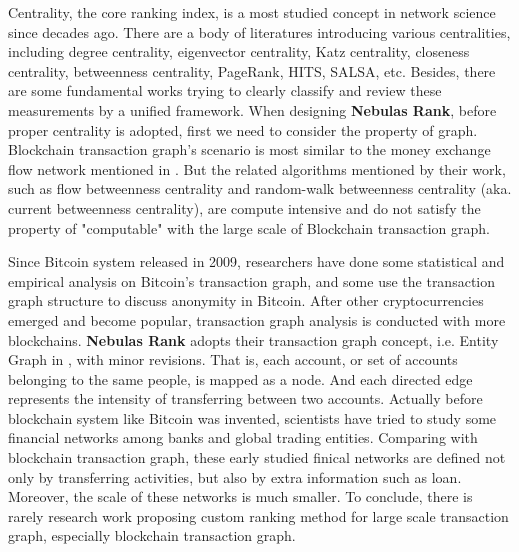 Centrality, the core ranking index, is a most studied concept in network science since decades ago\cite{newman2010networks}. There are a body of literatures introducing various centralities, including degree centrality\cite{freeman1979set}, eigenvector centrality\cite{bonacich1972factoring}, Katz centrality\cite{katz1953new}, closeness centrality\cite{sabidussi1966centrality}, betweenness centrality\cite{freeman1977set}\cite{freeman1978centrality}\cite{freeman1991centrality}\cite{noh2004random}\cite{newman2005measure}, PageRank\cite{Brin2010}, HITS\cite{kleinberg1999authoritative}, SALSA\cite{Science2001}, etc. Besides, there are some fundamental works trying to clearly classify and review these measurements by a unified framework\cite{Borgatti2005}\cite{Borgatti2006}\cite{Lu2016}. When designing \textbf{Nebulas Rank}, before proper centrality is adopted, first we need to consider the property of graph. Blockchain transaction graph's scenario is most similar to the money exchange flow network mentioned in \cite{Borgatti2005}. But the related algorithms mentioned by their work, such as flow betweenness centrality\cite{freeman1991centrality} and random-walk betweenness centrality (aka. current betweenness centrality)\cite{newman2005measure}, are compute intensive and do not satisfy the property of "computable" with the large scale of Blockchain transaction graph.

Since Bitcoin\cite{Nakamoto2008} system released in 2009, researchers have done some statistical and empirical analysis on Bitcoin's transaction graph\cite{Ron}\cite{Haslhofer}\cite{NielKondor2014}\cite{Baumann2014}, and some use the transaction graph structure to discuss anonymity in Bitcoin\cite{Meiklejohn2013}\cite{Ober2013}\cite{pham2016anomaly}\cite{Fleder2015}\cite{Ferrin2015}. After other cryptocurrencies emerged and become popular, transaction graph analysis is conducted with more blockchains\cite{Chang2017}\cite{Anderson2016}. \textbf{Nebulas Rank} adopts their transaction graph concept, i.e. Entity Graph in \cite{Tschorsch2015}, with minor revisions. That is, each account, or set of accounts belonging to the same people, is mapped as a node. And each directed edge represents the intensity of transferring between two accounts. Actually before blockchain system like Bitcoin was invented, scientists have tried to study some financial networks among banks and global trading entities\cite{propper2008towards}\cite{Boss2004}\cite{Serrano2007}\cite{Bech2008}\cite{Fagiolo2009}\cite{Morten2006}\cite{Boss2004a}\cite{Krempel2002}\cite{Serrano2003}. Comparing with blockchain transaction graph, these early studied finical networks are defined not only by transferring activities, but also by extra information such as loan. Moreover, the scale of these networks is much smaller. To conclude, there is rarely research work proposing custom ranking method for large scale transaction graph, especially blockchain transaction graph.


